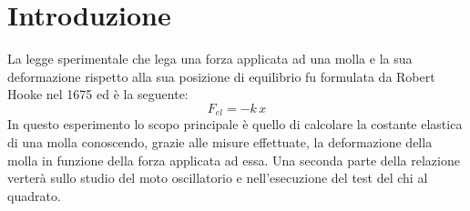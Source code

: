 \section{Introduzione}
La legge sperimentale che lega una forza applicata ad una molla e la sua deformazione rispetto alla sua posizione di equilibrio fu formulata da Robert Hooke nel 1675 ed è la seguente:
\begin{equation}
	F_{el} = -k\,x
	\label{hooke}
\end{equation}
In questo esperimento lo scopo principale è quello di calcolare la costante elastica di una molla conoscendo, grazie alle misure effettuate, la deformazione della molla in funzione della forza applicata ad essa. Una seconda parte della relazione verterà sullo studio del moto oscillatorio e nell'esecuzione del test del chi al quadrato.

